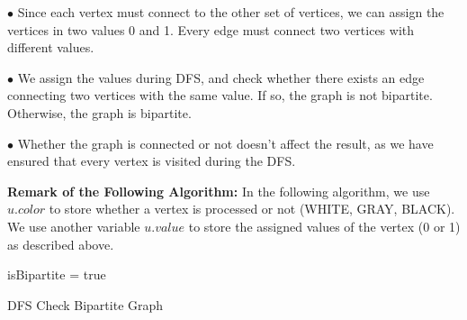 \documentclass[10pt]{article}
\begin{document}
$\bullet$ Since each vertex must connect to the other set of vertices, we can assign the vertices in two values 0 and 1. Every edge must connect two vertices with different values.

$\bullet$ We assign the values during DFS, and check whether there exists an edge connecting two vertices with the same value. If so, the graph is not bipartite. Otherwise, the graph is bipartite.

$\bullet$ Whether the graph is connected or not doesn't affect the result, as we have ensured that every vertex is visited during the DFS.

\textbf{Remark of the Following Algorithm:} In the following algorithm, we use $u.color$ to store whether a vertex is processed or not (WHITE, GRAY, BLACK). We use another variable $u.value$ to store the assigned values of the vertex (0 or 1) as described above.

\begin{algorithm}
	\SetAlgoLined
	
	isBipartite = true


	\vspace*{1em}
	
	
	\caption{DFS Check Bipartite Graph}

\end{algorithm}
\end{document}
